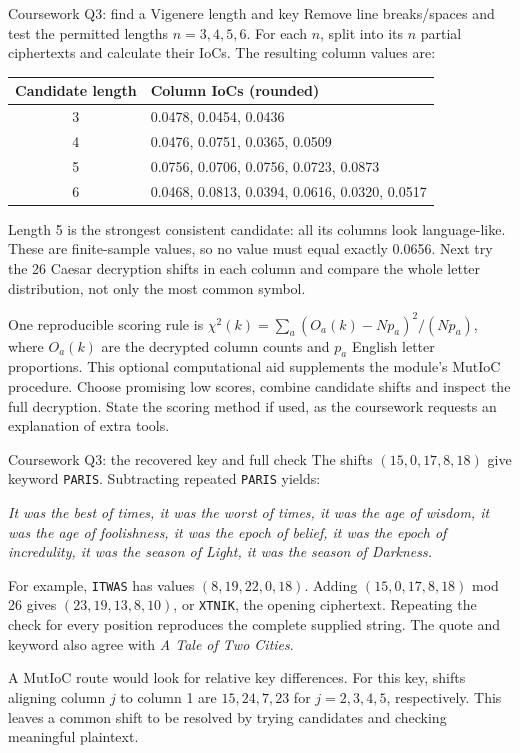 \documentclass[11pt,a4paper]{article}
\begin{document}
\begin{method}{Coursework Q3: find a Vigenere length and key}
Remove line breaks/spaces and test the permitted lengths \(n=3,4,5,6\). For each \(n\), split into its \(n\) partial ciphertexts and calculate their IoCs. The resulting column values are:
\begin{center}\begin{tabular}{cl}\toprule Candidate length&Column IoCs (rounded)\\\midrule
3&0.0478, 0.0454, 0.0436\\
4&0.0476, 0.0751, 0.0365, 0.0509\\
5&0.0756, 0.0706, 0.0756, 0.0723, 0.0873\\
6&0.0468, 0.0813, 0.0394, 0.0616, 0.0320, 0.0517\\\bottomrule\end{tabular}\end{center}
Length 5 is the strongest consistent candidate: all its columns look language-like. These are finite-sample values, so no value must equal exactly 0.0656. Next try the 26 Caesar decryption shifts in each column and compare the whole letter distribution, not only the most common symbol.

One reproducible scoring rule is \(\chi^2(k)=\sum_a(O_a(k)-Np_a)^2/(Np_a)\), where \(O_a(k)\) are the decrypted column counts and \(p_a\) English letter proportions. This optional computational aid supplements the module's MutIoC procedure. Choose promising low scores, combine candidate shifts and inspect the full decryption. State the scoring method if used, as the coursework requests an explanation of extra tools.
\end{method}
\begin{example}{Coursework Q3: the recovered key and full check}
The shifts \((15,0,17,8,18)\) give keyword \texttt{PARIS}. Subtracting repeated \texttt{PARIS} yields:

\textit{It was the best of times, it was the worst of times, it was the age of wisdom, it was the age of foolishness, it was the epoch of belief, it was the epoch of incredulity, it was the season of Light, it was the season of Darkness.}

For example, \texttt{ITWAS} has values \((8,19,22,0,18)\). Adding \((15,0,17,8,18)\) mod 26 gives \((23,19,13,8,10)\), or \texttt{XTNIK}, the opening ciphertext. Repeating the check for every position reproduces the complete supplied string. The quote and keyword also agree with \emph{A Tale of Two Cities}.

A MutIoC route would look for relative key differences. For this key, shifts aligning column \(j\) to column 1 are \(15,24,7,23\) for \(j=2,3,4,5\), respectively. This leaves a common shift to be resolved by trying candidates and checking meaningful plaintext.
\end{example}
\end{document}
